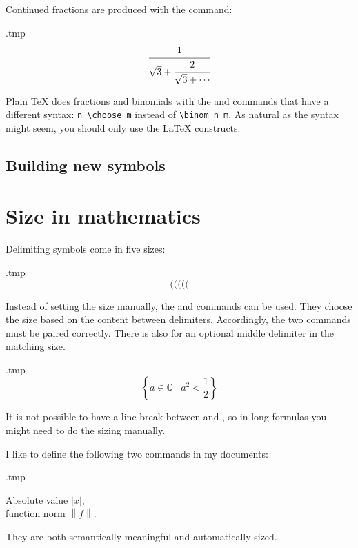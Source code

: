 Continued fractions are produced with the  command:
%
\begin{VerbatimOut}{\jobname.tmp}
\[
\cfrac{1}{\sqrt 3 + \cfrac{2}{\sqrt 3 + \dotsb}}
\]
\end{VerbatimOut}
\ShowExample

\begin{warning}
Plain \TeX{} does fractions and binomials with the  and  commands
that have a different syntax: \verb|n \choose m| instead of \verb|\binom n m|.
As natural as the syntax might seem, you should only use the \LaTeX{} constructs.
\end{warning}


%
%
\subsection{Building new symbols}





%
%
%
\section{Size in mathematics}

Delimiting symbols come in five sizes:
\begin{VerbatimOut}{\jobname.tmp}
\[
( \big( \Big( \bigg( \Bigg(
\]
\end{VerbatimOut}
\ShowExample
%
Instead of setting the size manually,
the  and  commands can be used.
They choose the size based on the content between delimiters.
Accordingly, the two commands must be paired correctly.
There is also  for an optional middle delimiter in the matching size.
%
\begin{VerbatimOut}{\jobname.tmp}
\[
\left\{ a \in \mathbb Q
  \middle| a^2 < \frac 1 2 \right\}
\]
\end{VerbatimOut}
\ShowExample

\begin{gotcha}
It is not possible to have a line break between  and ,
so in long formulas you might need to do the sizing manually.
\end{gotcha}

\begin{practices}
I like to define the following two commands in my documents:
%
\begin{VerbatimOut}{\jobname.tmp}
\newcommand{\abs}[1]{\left|#1\right|}
\newcommand{\norm}[1]{\left\|#1\right\|}

Absolute value $\abs x$,\\
function norm $\norm f$.
\end{VerbatimOut}
\ShowExample
%
They are both semantically meaningful and automatically sized.
\end{practices}

